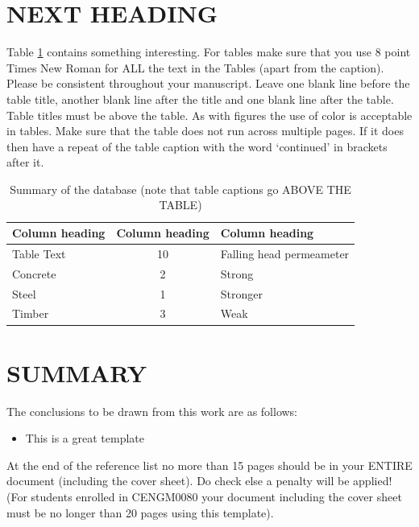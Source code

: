 \documentclass[a4paper,10pt]{article}
\begin{document}
\section{NEXT HEADING}

Table \ref{tab_materials} contains something interesting. For tables make sure that you use 8 point Times New Roman for ALL the text in the Tables (apart from the caption). Please be consistent throughout your manuscript. Leave one blank line before the table title, another blank line after the title and one blank line after the table. Table titles must be above the table. As with figures the use of color is acceptable in tables. Make sure that the table does not run across multiple pages. If it does then have a repeat of the table caption with the word ‘continued’ in brackets after it.


\begin{table}[h]
\begin{center}
\caption{Summary of the database (note that table captions go ABOVE THE TABLE)}
\begin{tabular}{ |l|c|l| }
\hline
 \textbf{Column heading} & \textbf{Column heading}    & \textbf{Column heading} \\ \hline 
 Table Text     & 10     & Falling head permeameter \\  \hline 
 Concrete       & 2      & Strong \\ \hline 
 Steel          & 1      & Stronger \\ \hline 
 Timber         & 3      & Weak \\ 
 \hline
\end{tabular}
\label{tab_materials}
\end{center}
\end{table}


\section{SUMMARY}

The conclusions to be drawn from this work are as follows:
\begin{itemize}
    \item 	This is a great template
\end{itemize}


At the end of the reference list no more than 15 pages should be in your ENTIRE document (including the cover sheet). Do check else a penalty will be applied!  (For students enrolled in CENGM0080 your document including the cover sheet must be no longer than 20 pages using this template).
\end{document}
